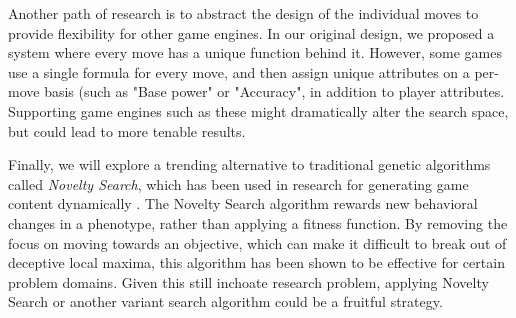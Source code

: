 \documentclass{acm_proc_article-sp}
\begin{document}
	Another path of research is to abstract the design of the individual moves to provide flexibility for other game engines. In our original design, we proposed a system where every move has a unique function behind it. However, some games use a single formula for every move, and then assign unique attributes on a per-move basis (such as "Base power" or "Accuracy", in addition to player attributes. Supporting game engines such as these might dramatically alter the search space, but could lead to more tenable results.
    
	Finally, we will explore a trending alternative to traditional genetic algorithms called \textit{Novelty Search}, which has been used in research for generating game content dynamically \cite{novelty_search}. The Novelty Search algorithm rewards new behavioral changes in a phenotype, rather than applying a fitness function. By removing the focus on moving towards an objective, which can make it difficult to break out of deceptive local maxima, this algorithm has been shown to be effective for certain problem domains. Given this still inchoate research problem, applying Novelty Search or another variant search algorithm could be a fruitful strategy.
    
%






\clearpage

\balancecolumns
\end{document}
